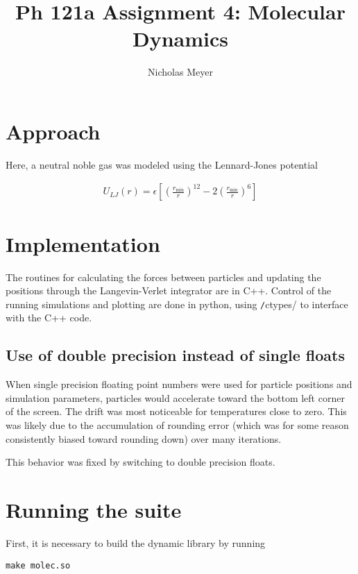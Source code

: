 \documentclass[12pt]{article}
\begin{document}
\title{Ph 121a Assignment 4: Molecular Dynamics}
\author{Nicholas Meyer}

\maketitle

\section{Approach}

Here, a neutral noble gas was modeled using the Lennard-Jones potential

\begin{align}
  U_{LJ}(r) = \epsilon \left[\left(\frac{r_{\text{min}}}{r}\right)^{12}
  - 2\left(\frac{r_{\text{min}}}{r}\right)^6\right]
\end{align}

\section{Implementation}

The routines for calculating the forces between particles and updating the
positions through the Langevin-Verlet integrator are in C++.
Control of the running simulations and plotting are done in python, using
\texttt/ctypes/ to interface with the C++ code.

\subsection{Use of double precision instead of single floats}

When single precision floating point numbers were used for particle positions
and simulation parameters, particles would accelerate toward the bottom left
corner of the screen. The drift was most noticeable for temperatures close to
zero. This was likely due to the accumulation of rounding error (which was
for some reason consistently biased toward rounding down) over many
iterations.

This behavior was fixed by switching to double precision floats.

\section{Running the suite}

First, it is necessary to build the dynamic library by running

\begin{verbatim}
make molec.so
\end{verbatim}
\end{document}
